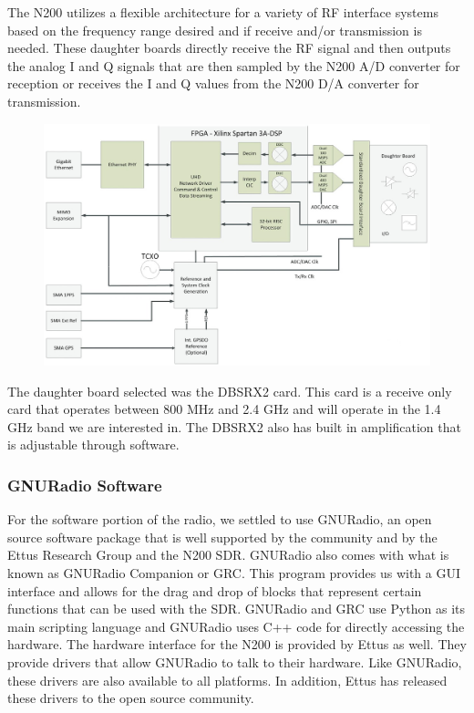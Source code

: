 The N200 utilizes a flexible architecture for a variety of RF interface systems based on the frequency range desired and if receive and/or transmission is needed.  These daughter boards directly receive the RF signal and then outputs the analog I and Q signals that are then sampled by the N200 A/D converter for reception or receives the I and Q values from the N200 D/A converter for transmission. 

{\begin{figure}[h!tb] 
\centering
\includegraphics[width=14cm]{Images/n200_block_edited}
\label{N200_block}
\end{figure}
}

The daughter board selected was the DBSRX2 card.  This card is a receive only card that operates between 800 MHz and 2.4 GHz and will operate in the 1.4 GHz band we are interested in.  The DBSRX2 also has built in amplification that is adjustable through software.

\subsubsection{GNURadio Software}

For the software portion of the radio, we settled to use GNURadio, an open source software package that is well supported by the community and by the Ettus Research Group and the N200 SDR.  GNURadio also comes with what is known as GNURadio Companion or GRC.  This program provides us with a GUI interface and allows for the drag and drop of blocks that represent certain functions that can be used with the SDR.  GNURadio and GRC use Python as its main scripting language and GNURadio uses C++ code for directly accessing the hardware.  The hardware interface for the N200 is provided by Ettus as well.  They provide drivers that allow GNURadio to talk to their hardware.  Like GNURadio, these drivers are also available to all platforms.  In addition, Ettus has released these drivers to the open source community.

